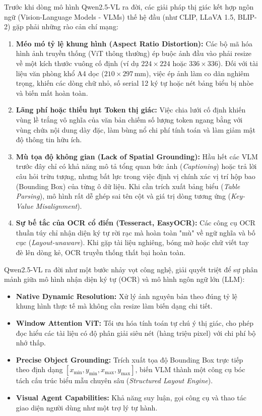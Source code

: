 \documentclass[11pt,a4paper]{article}
\begin{document}
Trước khi dòng mô hình Qwen2.5-VL ra đời, các giải pháp thị giác kết hợp ngôn ngữ (Vision-Language Models - VLMs) thế hệ đầu (như CLIP, LLaVA 1.5, BLIP-2) gặp phải những rào cản chí mạng:
\begin{enumerate}[leftmargin=1.8em]
    \item \textbf{Méo mó tỷ lệ khung hình (Aspect Ratio Distortion):} Các bộ mã hóa hình ảnh truyền thống (ViT thông thường) ép buộc ảnh đầu vào phải resize về một kích thước vuông cố định (ví dụ $224 \times 224$ hoặc $336 \times 336$). Đối với tài liệu văn phòng khổ A4 dọc ($210 \times 297\,\text{mm}$), việc ép ảnh làm co dãn nghiêm trọng, khiến các dòng chữ nhỏ, số serial 12 ký tự hoặc nét bảng biểu bị nhòe và biến mất hoàn toàn.
    \item \textbf{Lãng phí hoặc thiếu hụt Token thị giác:} Việc chia lưới cố định khiến vùng lề trắng vô nghĩa của văn bản chiếm số lượng token ngang bằng với vùng chứa nội dung dày đặc, làm bùng nổ chi phí tính toán và làm giảm mật độ thông tin hữu ích.
    \item \textbf{Mù tọa độ không gian (Lack of Spatial Grounding):} Hầu hết các VLM trước đây chỉ có khả năng mô tả tổng quan bức ảnh (\textit{Captioning}) hoặc trả lời câu hỏi trừu tượng, nhưng bất lực trong việc định vị chính xác vị trí hộp bao (Bounding Box) của từng ô dữ liệu. Khi cần trích xuất bảng biểu (\textit{Table Parsing}), mô hình rất dễ ghép sai tên cột và giá trị dòng tương ứng (\textit{Key-Value Misalignment}).
    \item \textbf{Sự bế tắc của OCR cổ điển (Tesseract, EasyOCR):} Các công cụ OCR thuần túy chỉ nhận diện ký tự rời rạc mà hoàn toàn "mù" về ngữ nghĩa và bố cục (\textit{Layout-unaware}). Khi gặp tài liệu nghiêng, bóng mờ hoặc chữ viết tay đè lên dòng kẻ, OCR truyền thống thất bại hoàn toàn.
\end{enumerate}

\begin{coreconceptbox}
Qwen2.5-VL ra đời như một bước nhảy vọt công nghệ, giải quyết triệt để sự phân mảnh giữa mô hình nhận diện ký tự (OCR) và mô hình ngôn ngữ lớn (LLM):
\begin{itemize}[leftmargin=1.5em]
    \item \textbf{Native Dynamic Resolution:} Xử lý ảnh nguyên bản theo đúng tỷ lệ khung hình thực tế mà không cần resize làm biến dạng chi tiết.
    \item \textbf{Window Attention ViT:} Tối ưu hóa tính toán tự chú ý thị giác, cho phép đọc hiểu các tài liệu có độ phân giải siêu nét (hàng triệu pixel) với chi phí bộ nhớ thấp.
    \item \textbf{Precise Object Grounding:} Trích xuất tọa độ Bounding Box trực tiếp theo định dạng $[x_{\min}, y_{\min}, x_{\max}, y_{\max}]$, biến VLM thành một công cụ bóc tách cấu trúc biểu mẫu chuyên sâu (\textit{Structured Layout Engine}).
    \item \textbf{Visual Agent Capabilities:} Khả năng suy luận, gọi công cụ và thao tác giao diện người dùng như một trợ lý tự hành.
\end{itemize}
\end{coreconceptbox}
\end{document}
